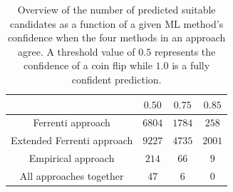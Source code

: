 \documentclass[superscriptaddress,unsortedaddress,
 amsmath,amssymb,
 aps,
]{revtex4-2}
\begin{document}
\begin{table}[t]
    \centering 
    \caption{Overview of the number of predicted suitable candidates as a function of a given ML method's confidence when the four methods in an approach agree. A threshold value of $0.5$ represents the confidence of a coin flip while $1.0$ is a fully confident prediction.}
    \begin{tabular}{c|c|c|c}
      & $0.50$ & $0.75$ & $0.85$ \\
     \hline
     Ferrenti approach &  $6804$ & $1784$ & $258$  \\
     Extended Ferrenti approach &  $9227$ & $4735$  & $2001$  \\ 
     Empirical approach & $214$ & $66$ & $9$ \\
     \hline
     All approaches together & $47$ & $6$ & 0 \\
    \end{tabular}
    \label{tab:probabilites}
\end{table} 


 
\end{document}
